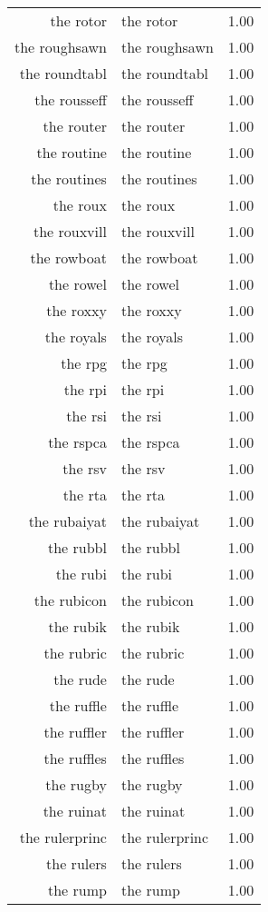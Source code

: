 \begin{table}[ht]
\begin{tabular}{rlr}
  the rotor & the rotor & 1.00 \\ 
  the roughsawn & the roughsawn & 1.00 \\ 
  the roundtabl & the roundtabl & 1.00 \\ 
  the rousseff & the rousseff & 1.00 \\ 
  the router & the router & 1.00 \\ 
  the routine & the routine & 1.00 \\ 
  the routines & the routines & 1.00 \\ 
  the roux & the roux & 1.00 \\ 
  the rouxvill & the rouxvill & 1.00 \\ 
  the rowboat & the rowboat & 1.00 \\ 
  the rowel & the rowel & 1.00 \\ 
  the roxxy & the roxxy & 1.00 \\ 
  the royals & the royals & 1.00 \\ 
  the rpg & the rpg & 1.00 \\ 
  the rpi & the rpi & 1.00 \\ 
  the rsi & the rsi & 1.00 \\ 
  the rspca & the rspca & 1.00 \\ 
  the rsv & the rsv & 1.00 \\ 
  the rta & the rta & 1.00 \\ 
  the rubaiyat & the rubaiyat & 1.00 \\ 
  the rubbl & the rubbl & 1.00 \\ 
  the rubi & the rubi & 1.00 \\ 
  the rubicon & the rubicon & 1.00 \\ 
  the rubik & the rubik & 1.00 \\ 
  the rubric & the rubric & 1.00 \\ 
  the rude & the rude & 1.00 \\ 
  the ruffle & the ruffle & 1.00 \\ 
  the ruffler & the ruffler & 1.00 \\ 
  the ruffles & the ruffles & 1.00 \\ 
  the rugby & the rugby & 1.00 \\ 
  the ruinat & the ruinat & 1.00 \\ 
  the rulerprinc & the rulerprinc & 1.00 \\ 
  the rulers & the rulers & 1.00 \\ 
  the rump & the rump & 1.00 \\ 

\end{tabular}
\end{table}
